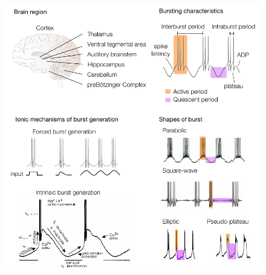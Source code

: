 \begin{figure}[h!]
    \centering
    \includegraphics[scale=1]{latex/fig/Intro/Bgd_Burst.pdf}
    \caption{\citep{zeldenrust_neural_2018, desroches_classification_2022, mccormick_sleep_1997}}
    \label{fig:intro_burst}
\end{figure}

~\\
\newpage

